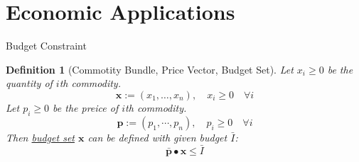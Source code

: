 \documentclass[a4paper,11pt]{article}
\newtheorem{defn}{Definition}
\begin{document}
\section{Economic Applications} %
\label{sec:economic_applications}
\begin{frame}[t]{Budget Constraint}
	\begin{defn}
		[Commotity Bundle, Price Vector, Budget Set]
		Let $x_i\ge 0$ be the quantity of $i$th commodity. 
		\[
			\mathbf{x}:=(x_1,\dots,x_n),\quad x_i \ge 0\quad\forall i \tag{Commodity Bundle}
		\]
		Let $p_i\ge 0$ be the preice of $i$th commodity. \[
			\mathbf{p}:=(p_1,\cdots,p_n),\quad p_i \ge 0\quad\forall i \tag{Price Vector}
		\]
		Then \uline{budget set} $\mathbf{x}$ can be defined with given budget $\bar{I}$:\[
			\bar{\mathbf{p}}\bullet{\mathbf{x}}\le \bar I \tag{Budget Constraint}
		\]
	\end{defn}
\end{frame}
\end{document}
